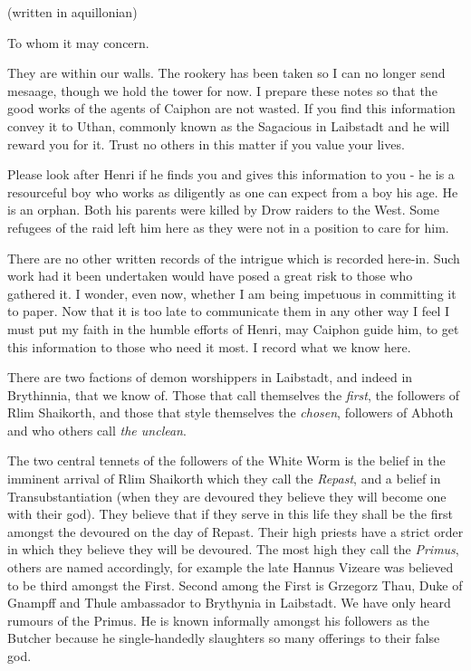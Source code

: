 \documentclass{letter}
\begin{document}
\begin{letter}{}

\begin{tt}(written in aquillonian)\end{tt}
\date{}
\opening{To whom it may concern.}



                  They are within our walls.  The rookery has been taken so I can no longer send mesaage, though we hold the tower for now.  I prepare these notes so that the good works of the agents of Caiphon are not wasted.  If you find this information convey it to Uthan, commonly known as the Sagacious in Laibstadt and he will reward you for it.  Trust no others in this matter if you value your lives.  

Please look after Henri if he finds you and gives this information to you - he is a resourceful boy who works as diligently as one can expect from a boy his age.  He is an orphan.  Both his parents were killed by Drow raiders to the West.  Some refugees of the raid left him here as they were not in a position to care for him.

There are no other written records of the intrigue which is recorded here-in.  Such work had it been undertaken would have posed a great risk to those who gathered it.  I wonder, even now, whether I am being impetuous in committing it to paper.  Now that it is too late to communicate them in any other way I feel I must put my faith in the humble efforts of Henri, may Caiphon guide him, to get this information to those who need it most.  I record what we know here.

There are two factions of demon worshippers in Laibstadt, and indeed in Brythinnia, that we know of.  Those that call themselves the \emph{first}, the followers of Rlim Shaikorth, and those that style themselves the \emph{chosen}, followers of Abhoth and who others call \emph{the unclean}.

The two central tennets of the followers of the White Worm is the belief in the imminent arrival of Rlim Shaikorth which they call the \emph{Repast}, and a belief in Transubstantiation (when they are devoured they believe they will become one with their god).  They believe that if they serve in this life they shall be the first amongst the devoured on the day of Repast.  Their high priests have a strict order in which they believe they will be devoured.  The most high they call the \emph{Primus}, others are named accordingly, for example the late Hannus Vizeare was believed to be third amongst the First.  Second among the First is Grzegorz Thau, Duke of Gnampff and Thule ambassador to Brythynia in Laibstadt.  We have only heard rumours of the Primus.  He is known informally amongst his followers as the Butcher because he single-handedly slaughters so many offerings to their false god.


\end{letter}
\end{document}
